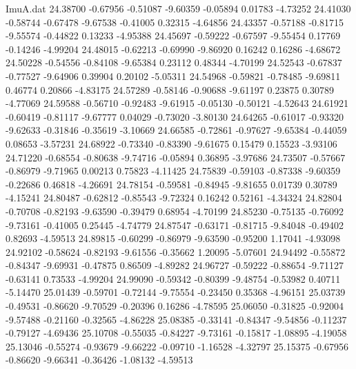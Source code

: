 \begin{filecontents}{ImuA.dat}
  24.38700   -0.67956   -0.51087   -9.60359   -0.05894    0.01783   -4.73252
  24.41030   -0.58744   -0.67478   -9.67538   -0.41005    0.32315   -4.64856
  24.43357   -0.57188   -0.81715   -9.55574   -0.44822    0.13233   -4.95388
  24.45697   -0.59222   -0.67597   -9.55454    0.17769   -0.14246   -4.99204
  24.48015   -0.62213   -0.69990   -9.86920    0.16242    0.16286   -4.68672
  24.50228   -0.54556   -0.84108   -9.65384    0.23112    0.48344   -4.70199
  24.52543   -0.67837   -0.77527   -9.64906    0.39904    0.20102   -5.05311
  24.54968   -0.59821   -0.78485   -9.69811    0.46774    0.20866   -4.83175
  24.57289   -0.58146   -0.90688   -9.61197    0.23875    0.30789   -4.77069
  24.59588   -0.56710   -0.92483   -9.61915   -0.05130   -0.50121   -4.52643
  24.61921   -0.60419   -0.81117   -9.67777    0.04029   -0.73020   -3.80130
  24.64265   -0.61017   -0.93320   -9.62633   -0.31846   -0.35619   -3.10669
  24.66585   -0.72861   -0.97627   -9.65384   -0.44059    0.08653   -3.57231
  24.68922   -0.73340   -0.83390   -9.61675    0.15479    0.15523   -3.93106
  24.71220   -0.68554   -0.80638   -9.74716   -0.05894    0.36895   -3.97686
  24.73507   -0.57667   -0.86979   -9.71965    0.00213    0.75823   -4.11425
  24.75839   -0.59103   -0.87338   -9.60359   -0.22686    0.46818   -4.26691
  24.78154   -0.59581   -0.84945   -9.81655    0.01739    0.30789   -4.15241
  24.80487   -0.62812   -0.85543   -9.72324    0.16242    0.52161   -4.34324
  24.82804   -0.70708   -0.82193   -9.63590   -0.39479    0.68954   -4.70199
  24.85230   -0.75135   -0.76092   -9.73161   -0.41005    0.25445   -4.74779
  24.87547   -0.63171   -0.81715   -9.84048   -0.49402    0.82693   -4.59513
  24.89815   -0.60299   -0.86979   -9.63590   -0.95200    1.17041   -4.93098
  24.92102   -0.58624   -0.82193   -9.61556   -0.35662    1.20095   -5.07601
  24.94492   -0.55872   -0.84347   -9.69931   -0.47875    0.86509   -4.89282
  24.96727   -0.59222   -0.88654   -9.71127   -0.63141    0.73533   -4.99204
  24.99090   -0.59342   -0.80399   -9.48754   -0.53982    0.40711   -5.14470
  25.01439   -0.59701   -0.72144   -9.75554   -0.23450    0.35368   -4.96151
  25.03739   -0.49531   -0.86620   -9.70529   -0.20396    0.16286   -4.78595
  25.06050   -0.31825   -0.92004   -9.57488   -0.21160   -0.32565   -4.86228
  25.08385   -0.33141   -0.84347   -9.54856   -0.11237   -0.79127   -4.69436
  25.10708   -0.55035   -0.84227   -9.73161   -0.15817   -1.08895   -4.19058
  25.13046   -0.55274   -0.93679   -9.66222   -0.09710   -1.16528   -4.32797
  25.15375   -0.67956   -0.86620   -9.66341   -0.36426   -1.08132   -4.59513

\end{filecontents}
